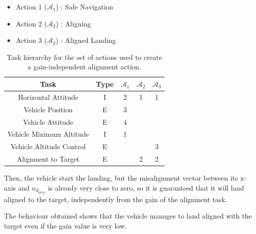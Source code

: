 \documentclass{article}
\begin{document}
\begin{table}[htb]
	\caption{Task hierarchy for the set of actions used to create a gain-independent alignment action.}
	\begin{itemize}
		\item Action 1 ($\mathcal{A}_{1}$) : Safe Navigation
		\item Action 2 ($\mathcal{A}_{2}$) : Aligning
		\item Action 3 ($\mathcal{A}_{2}$) : Aligned Landing
	\end{itemize}
	\label{tb_align3:actions_table}
	\begin{center}
		\footnotesize
		\begin{tabular}{ccccc}
			\toprule
			Task & Type & $\mathcal{A}_{1}$ & $\mathcal{A}_{2}$ & $\mathcal{A}_{3}$\\
			\midrule
			Horizontal Attitude             & I & 2 & 1 & 1 \\
			\hdashline
			Vehicle Position				& E & 3 &   &   \\
			\hdashline
			Vehicle Attitude                & E & 4 &   &   \\
			\hdashline
			Vehicle Minimum Altitude        & I & 1 &   &   \\
			\hdashline
			Vehicle Altitude Control        & E &   &   & 3 \\
			\hdashline
			Alignment to Target             & E &   & 2 & 2 \\
			
			\bottomrule
		\end{tabular}
	\end{center}
\end{table}%
Then, the vehicle start the landing, but the misalignment vector between its x-axis and \(n_{d_{proj}}\) is already very close to zero, so it is guaranteed that it will land aligned to the target, independently from the gain of the alignment task.
\begin{figure}[H]
	\centering
	\label{im:v_land_gain0_1_ind}
\end{figure} 
The behaviour obtained shows that the vehicle manages to land aligned with the target even if the gain value is very low.
 
\end{document}
